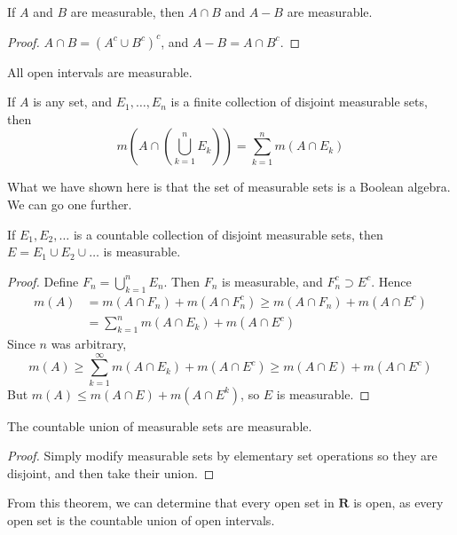 \begin{corollary}
    If $A$ and $B$ are measurable, then $A \cap B$ and $A - B$ are measurable.
\end{corollary}
\begin{proof}
    $A \cap B = (A^c \cup B^c)^c$, and $A - B = A \cap B^c$.
\end{proof}

\begin{corollary}
    All open intervals are measurable.
\end{corollary}

\begin{corollary}
    If $A$ is any set, and $E_1, \dots, E_n$ is a finite collection of disjoint measurable sets, then
    \[ m(A \cap (\bigcup_{k = 1}^n E_k)) = \sum_{k = 1}^n m(A \cap E_k) \]
\end{corollary}

What we have shown here is that the set of measurable sets is a Boolean algebra. We can go one further.

\begin{lemma}
    If $E_1, E_2, \dots$ is a countable collection of disjoint measurable sets, then $E = E_1 \cup E_2 \cup \dots$ is measurable.
\end{lemma}
\begin{proof}
    Define $F_n = \bigcup_{k = 1}^n E_n$. Then $F_n$ is measurable, and $F_n^c \supset E^c$. Hence
    \begin{align*}
        m(A) &= m(A \cap F_n) + m(A \cap F_n^c) \geq m(A \cap F_n) + m(A \cap E^c)\\
        &= \sum_{k = 1}^n m(A \cap E_k) + m(A \cap E^c)
    \end{align*}
    Since $n$ was arbitrary,
    \[ m(A) \geq \sum_{k = 1}^\infty m(A \cap E_k) + m(A \cap E^c) \geq m(A \cap E) + m(A \cap E^c) \]
    But $m(A) \leq m(A \cap E) + m(A \cap E^k)$, so $E$ is measurable.
\end{proof}

\begin{corollary}
    The countable union of measurable sets are measurable.
\end{corollary}
\begin{proof}
    Simply modify measurable sets by elementary set operations so they are disjoint, and then take their union.
\end{proof}

From this theorem, we can determine that every open set in $\mathbf{R}$ is open, as every open set is the countable union of open intervals.

